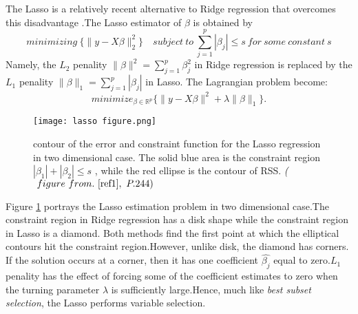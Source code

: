 \documentclass[12pt]{report}
\renewcommand{\emph}{\textit}
\begin{document}
	The Lasso is a relatively recent alternative to Ridge regression that overcomes this disadvantage .The Lasso estimator of $\beta$ is obtained by 
	\begin{equation}
		minimizing\  \bigg \{\parallel y- X\beta \parallel^{2}_{2}\bigg\}\quad subject\ to\ \sum_{j=1}^{p}|\beta_{j}|\leq s\ for\ some\ constant\ s
		\label{u2}
	\end{equation}
	Namely, the $L_{2}$ penality $\parallel \beta \parallel^{2}=\sum_{j=1}^{p}\beta_{j}^{2}$ in Ridge regression is replaced by the $L_{1}$ penality $\parallel \beta \parallel_{1}=\sum_{j=1}^{p}|\beta_{j}|$ in Lasso. The Lagrangian problem become:
	\begin{equation}
		minimize_{\beta \in \mathbb{R}^{p} } \{ \parallel y- X\beta \parallel^{2}+ \lambda \parallel \beta \parallel_{1}\}.
		\label{f18}
	\end{equation}
	\begin{figure}[h!]
		\begin{center}
			\texttt{[image: lasso figure.png]}
		\end{center}
		\caption[Contour of the error and constraint function for the Lasso regression]{contour of the error and constraint function for the Lasso regression in two dimensional case.
			The solid blue area is the constraint region $|\beta_{1}|+ |\beta_{2}|\leq s$ , while the red ellipse is the contour of RSS. \textsl{ ($\ figure\ from.\ \cite{ref1},\ P.244 ) $ } } 
		\label{tab3}
	\end{figure}
	
	Figure \ref{tab3} portrays the Lasso estimation problem in two dimensional case.The constraint region in Ridge regression has a disk shape while the constraint region in Lasso is a diamond. Both methods find the first point at which the elliptical contours hit the constraint region.However, unlike disk, the diamond has corners. If the solution occurs at a corner, then it has one coefficient $\hat{\beta_{j}}$ equal to zero.$L_{1}$ penality has the effect of forcing some of the coefficient estimates to zero when the turning parameter $\lambda$ is sufficiently large.Hence, much like \emph{best subset selection}, the Lasso performs variable selection.
	
\end{document}
